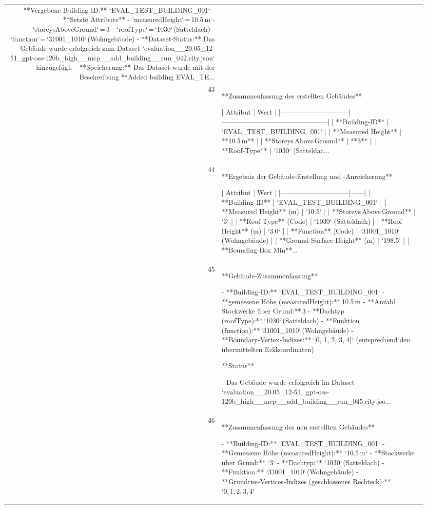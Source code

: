 \documentclass[a4paper,11pt]{article}
\begin{document}
\begin{table}[ht]
\begin{tabular}{r p{12cm}}
- **Vergebene Building‑ID:** `EVAL\_TEST\_BUILDING\_001`  
- **Setzte Attribute**  
  - `measuredHeight` = 10.5 m  
  - `storeysAboveGround` = 3  
  - `roofType` = `1030` (Satteldach)  
  - `function` = `31001\_1010` (Wohngebäude)  
- **Dataset‑Status:** Das Gebäude wurde erfolgreich zum Dataset `evaluation\_\_20.05\_12-51\_gpt-oss-120b\_high\_\_mcp\_\_add\_building\_\_run\_042.city.json` hinzugefügt.  
- **Speicherung:** Das Dataset wurde mit der Beschreibung *“Added building EVAL\_TE... \\
43 & **Zusammenfassung des erstellten Gebäudes**

| Attribut                     | Wert                                          |
|------------------------------|-----------------------------------------------|
| **Building‑ID**              | `EVAL\_TEST\_BUILDING\_001`                      |
| **Measured Height**          | **10.5 m**                                    |
| **Storeys Above Ground**     | **3**                                         |
| **Roof‑Type**                | `1030` (Satteldac... \\
44 & **Ergebnis der Gebäude‑Erstellung und -Anreicherung**

| Attribut                     | Wert |
|------------------------------|------|
| **Building‑ID**              | `EVAL\_TEST\_BUILDING\_001` |
| **Measured Height** (m)      | `10.5` |
| **Storeys Above Ground**     | `3` |
| **Roof Type** (Code)         | `1030` (Satteldach) |
| **Roof Height** (m)          | `3.0` |
| **Function** (Code)          | `31001\_1010` (Wohngebäude) |
| **Ground Surface Height** (m) | `198.5` |
| **Bounding‑Box Min**... \\
45 & **Gebäude‑Zusammenfassung**

- **Building‑ID:** `EVAL\_TEST\_BUILDING\_001`  
- **gemessene Höhe (measuredHeight):** 10.5 m  
- **Anzahl Stockwerke über Grund:** 3  
- **Dachtyp (roofType):** `1030` (Satteldach)  
- **Funktion (function):** `31001\_1010` (Wohngebäude)  
- **Boundary‑Vertex‑Indizes:** `[0, 1, 2, 3, 4]`  (entsprechend den übermittelten Eckkoordinaten)

**Status**

- Das Gebäude wurde erfolgreich im Dataset `evaluation\_\_20.05\_12-51\_gpt-oss-120b\_high\_\_mcp\_\_add\_building\_\_run\_045.city.jso... \\
46 & **Zusammenfassung des neu erstellten Gebäudes**

- **Building‑ID:** `EVAL\_TEST\_BUILDING\_001`  
- **Gemessene Höhe (measuredHeight):** `10.5 m`  
- **Stockwerke über Grund:** `3`  
- **Dachtyp:** `1030` (Satteldach)  
- **Funktion:** `31001\_1010` (Wohngebäude)  
- **Grundriss‑Vertices‑Indizes (geschlossenes Rechteck):** `0, 1, 2, 3, 4`  


\end{tabular}
\end{table}
\end{document}
